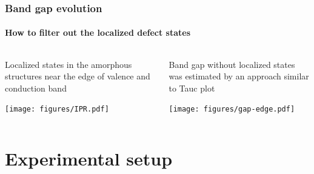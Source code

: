 \documentclass[noamsthm,8pt,t]{beamer}
\begin{document}
\begin{frame}
   \frametitle{Band gap evolution}
   \framesubtitle{How to filter out the localized defect states}

   \begin{columns}
      \begin{column}{0.5\textwidth}
         Localized states in the amorphous structures near the edge of valence and conduction band
         \begin{center}
            \texttt{[image: figures/IPR.pdf]}
         \end{center}
      \end{column}
      \pause
      \begin{column}{0.5\textwidth}
         Band gap without localized states was estimated by an approach similar to Tauc plot
         \begin{center}
            \texttt{[image: figures/gap-edge.pdf]}
         \end{center}
      \end{column}
   \end{columns}
\end{frame}

\section{Experimental setup}
\end{document}
